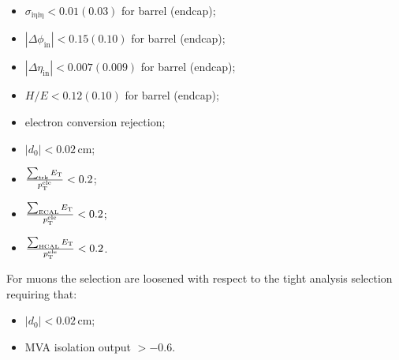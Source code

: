 \begin{itemize}
\item $\sigma_\mathrm{i\eta i\eta} < 0.01 (0.03)$ for barrel (endcap);
\item $|\Delta\phi_\mathrm{in}| < 0.15 (0.10)$ for barrel (endcap);
\item $|\Delta\eta_\mathrm{in}| < 0.007 (0.009)$ for barrel (endcap);
\item $H/E < 0.12 (0.10)$ for barrel (endcap);
\item electron conversion rejection;
\item $|d_0| < 0.02$\,cm;
\item $\frac{\sum_\mathrm{trk}E_\mathrm{T}}{p_\mathrm{T}^\mathrm{ele}} < 0.2$;
\item $\frac{\sum_\mathrm{ECAL}E_\mathrm{T}}{p_\mathrm{T}^\mathrm{ele}} < 0.2$;
\item $\frac{\sum_\mathrm{HCAL}E_\mathrm{T}}{p_\mathrm{T}^\mathrm{ele}} < 0.2$.
\end{itemize}

For muons the selection are loosened with respect to the tight analysis selection requiring that:

\begin{itemize}
\item $|d_0| < 0.02$\,cm;
\item MVA isolation output $> -0.6$.
\end{itemize}



